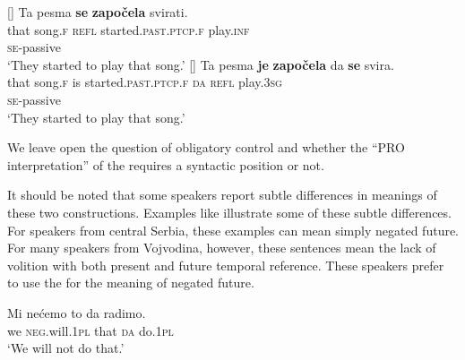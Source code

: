 \documentclass[output=paper,modfonts,newtxmath,hidelinks,]{langscibook}
\begin{document}
\ea \label{7:ex16}
	[]{ \label{7:ex16a2}
		 \gll Ta pesma \textbf{se} \textbf{započela} svirati.\\
         	  that song.\textsc{f} \textsc{refl} started.\textsc{past.ptcp.f} play.\textsc{inf}\\\hfill\textsc{se}-passive\\
		\glt `They started to play that song.'
	}
	[]{ \label{7:ex16b2}
		\gll Ta pesma \textbf{je} \textbf{započela} da \textbf{se} svira.\\
        	 that song.\textsc{f} is started.\textsc{past.ptcp.f} \textsc{da} \textsc{refl} play.\textsc{3sg}\\\hfill\textsc{se}-passive\\
		\glt `They started to play that song.'
	}
	\z
\z

\noindent We leave open the question of obligatory control and whether the ``PRO interpretation'' of the  requires a syntactic position or not. 

It should be noted that some speakers report subtle differences in meanings of these two constructions. Examples like  illustrate some of these subtle differences. For speakers from central Serbia, these examples can mean simply negated future. For many speakers from Vojvodina, however, these sentences mean the lack of volition with both present and future temporal reference. These speakers prefer to use the  for the meaning of negated future.

\ea \label{7:ex17}
\gll Mi nećemo to da radimo.\\
     we \textsc{neg.}will.\textsc{1pl} that \textsc{da} do.\textsc{1pl}\\
\glt `We will not do that.'
\z
\end{document}
